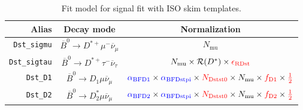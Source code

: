 \begin{landscape}
\begin{table}
\centering
\caption{
    Fit model for \Dstar signal fit with ISO skim templates.
}
\scriptsize

\begin{tabular}{r|c|c}
\toprule
        \textbf{Alias} &                                \textbf{Decay mode}                                &                                                                                                                                                                                   \textbf{Normalization}                                                                                                                                                                                   \\
\midrule
   \texttt{Dst\_sigmu} &           $\overline{B}^0 \rightarrow D^{*+} \mu^- \overline{\nu}_\mu$            &                                                                                                                                                                                       $N_\text{mu}$                                                                                                                                                                                        \\
  \texttt{Dst\_sigtau} &          $\overline{B}^0 \rightarrow D^{*+} \tau^- \overline{\nu}_\tau$           &                                                                                                                                                     $N_\text{mu} \times \mathcal{R}(D^*) \times \textcolor{red}{\epsilon_\text{RDst}}$                                                                                                                                                     \\
      \texttt{Dst\_D1} &              $\overline{B}^0 \rightarrow D_1 \mu \overline{\nu}_\mu$              &                                                                                  $\textcolor{blue}{\alpha_\text{BFD1}} \times \textcolor{blue}{\alpha_\text{BFDstpi}} \times \textcolor{red}{N_\text{Dstst0}} \times N_\text{mu} \times \textcolor{red}{f_\text{D1}} \times \textcolor{red}{\frac{1}{2}}$                                                                                  \\
      \texttt{Dst\_D2} &             $\overline{B}^0 \rightarrow D^*_2 \mu \overline{\nu}_\mu$             &                                                                                  $\textcolor{blue}{\alpha_\text{BFD2}} \times \textcolor{blue}{\alpha_\text{BFDstpi}} \times \textcolor{red}{N_\text{Dstst0}} \times N_\text{mu} \times \textcolor{red}{f_\text{D2}} \times \textcolor{red}{\frac{1}{2}}$                                                                                  \\

\end{tabular}
\end{table}
\end{landscape}
